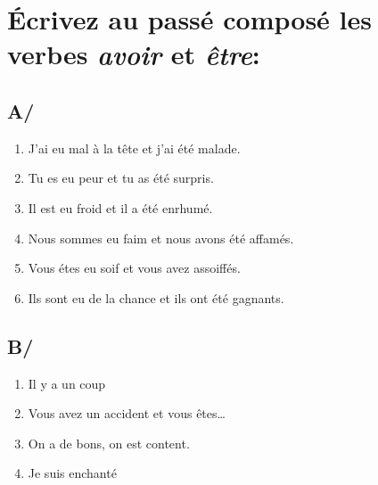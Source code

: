 \section{Écrivez au passé composé les verbes \emph{avoir} et \emph{être}:}
\subsection*{A/}

\begin{enumerate}
    \item J'ai eu mal à la tête et j'ai été malade.
    \item Tu es eu peur et tu as été surpris.
    \item Il est eu froid et il a été enrhumé.
    \item Nous sommes eu faim et nous avons été affamés.
    \item Vous étes eu soif et vous avez assoiffés.
    \item Ils sont eu de la chance et ils ont été gagnants. 
\end{enumerate}

\subsection*{B/}

\begin{enumerate}
    \item Il y a un coup
    \item Vous avez un accident et vous êtes\dots
    \item On a de bons, on est content.
    \item Je suis enchanté
\end{enumerate}